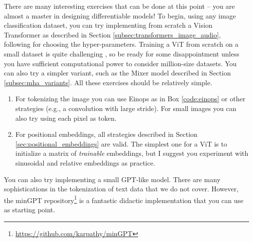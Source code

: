 There are many interesting exercises that can be done at this point -- you are almost a master in designing differentiable models! To begin, using any image classification dataset, you can try implementing from scratch a Vision Transformer as described in Section \ref{subsec:transformers_image_audio}, following \cite{dosovitskiy2020image} for choosing the hyper-parameters. Training a ViT from scratch on a small dataset is quite challenging \cite{lee2021vision,steiner2021train}, so be ready for some disappointment unless you have sufficient computational power to consider million-size datasets. You can also try a simpler variant, such as the Mixer model described in Section \ref{subsec:mha_variants}. All these exercises should be relatively simple. 

\begin{enumerate}
\item For tokenizing the image you can use Einops as in Box \ref{code:einops} or other strategies (e.g., a convolution with large stride). For small images you can also try using each pixel as token.
\item For positional embeddings, all strategies described in Section \ref{sec:positional_embeddings} are valid. The simplest one for a ViT is to initialize a matrix of \textit{trainable} embeddings, but I suggest you experiment with sinusoidal and relative embeddings as practice.
\end{enumerate}

You can also try implementing a small GPT-like model. There are many sophistications in the tokenization of text data that we do  not cover. However, the minGPT repository\footnote{\url{https://github.com/karpathy/minGPT}} is a fantastic didactic implementation that you can use as starting point.